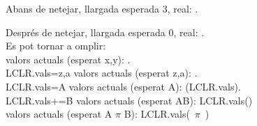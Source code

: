 \documentclass{article}
\begin{document}
Abans de netejar, llargada esperada 3, real: .\\

Després de netejar, llargada esperada 0, real: .\\
Es pot tornar a omplir:\\
valors actuals (esperat x,y): .\\
\pxSETlst LCLR.vals={z,a}
valors actuals (esperat z,a): .\\
\pxSET LCLR.vals=A
valors actuals (esperat A): \pxGETtl(LCLR.vals).\\
\pxPUT LCLR.vals+=B
valors actuals (esperat AB): \pxPRINTlst LCLR.vals()\\
valors actuals (esperat A $\pi$ B): \pxPRINTlst LCLR.vals(~$\pi$~)\\
\end{document}
